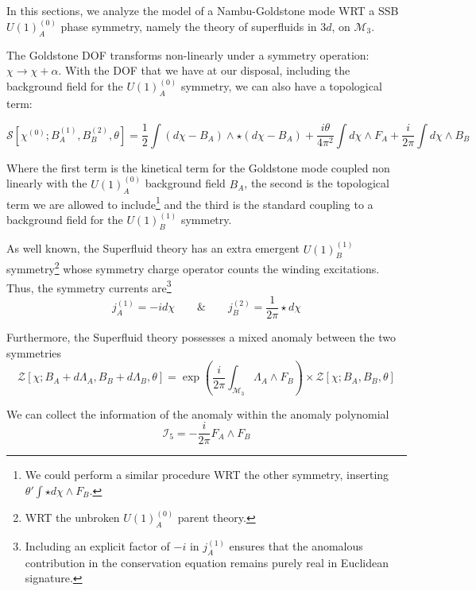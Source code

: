 \documentclass[aps,preprint,nofootinbib,preprintnumbers,eqsecnum,superscriptaddress]{revtex4}
\numberwithin{equation}{section}
\begin{document}
In this sections, we analyze the model of a Nambu-Goldstone mode WRT a SSB $U(1)^{(0)}_A$ phase symmetry, namely the theory of superfluids in $3d$, on $\mathcal{M}_3$.

The Goldstone DOF transforms non-linearly under a symmetry operation: $\chi \to \chi + \alpha$. With the DOF that we have at our disposal, including the background field for the $U(1)^{(0)}_A$ symmetry, we can also have a topological term: 

\begin{equation}
\mathcal{S}[\chi^{(0)} ; B_A^{(1)}, B_B^{(2)}, \theta] = \frac{1}{2}\int (d\chi - B_A)\wedge \star (d\chi - B_A) + \frac{i\theta}{4 \pi^2} \int d\chi \wedge F_A + \frac{i}{2 \pi} \int d\chi \wedge B_B 
\end{equation}

Where the first term is the kinetical term for the Goldstone mode coupled non linearly with the $U(1)^{(0)}_A$ background field $B_A$, the second is the topological term we are allowed to include\footnote{We could perform a similar procedure WRT the other symmetry, inserting $ \theta ' \int \star d\chi \wedge F_B$.} and the third is the standard coupling to a background field for the $U(1)^{(1)}_B$ symmetry.

As well known, the Superfluid theory has an extra emergent $U(1)^{(1)}_B$ symmetry\footnote{WRT the unbroken $U(1)^{(0)}_A$ parent theory.} whose symmetry charge operator counts the winding excitations. Thus, the symmetry currents are\footnote{Including an explicit factor of $-i$ in $j^{(1)}_A$ ensures that the anomalous contribution in the conservation equation remains purely real in Euclidean signature.}
\begin{equation}
j^{(1)}_A = -i d \chi \qquad \& \qquad j^{(2)}_B = \frac{1}{2 \pi} \star d \chi
\end{equation}

Furthermore, the Superfluid theory possesses a mixed anomaly between the two symmetries
\begin{equation}
\mathcal{Z}[\chi ; B_A + d\Lambda_A, B_B + d\Lambda_B, \theta] = \exp \left(  \frac{i}{2\pi} \int_{\mathcal{M}_3} \Lambda_A \wedge F_B  \right) \times\mathcal{Z}[\chi ; B_A, B_B, \theta]
\end{equation}

We can collect the information of the anomaly within the anomaly polynomial
\begin{equation}
\mathcal{I}_5 = -\frac{i}{2\pi} F_A \wedge F_B
\end{equation}
\end{document}
